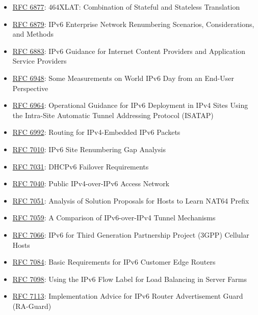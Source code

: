 \documentclass[
]{article}
\begin{document}
\begin{itemize}
  Statement for Renumbering IPv6 Hosts with Static Addresses in
  Enterprise Networks
\item
  \href{https://www.rfc-editor.org/info/rfc6877}{RFC 6877}: 464XLAT:
  Combination of Stateful and Stateless Translation
\item
  \href{https://www.rfc-editor.org/info/rfc6879}{RFC 6879}: IPv6
  Enterprise Network Renumbering Scenarios, Considerations, and Methods
\item
  \href{https://www.rfc-editor.org/info/rfc6883}{RFC 6883}: IPv6
  Guidance for Internet Content Providers and Application Service
  Providers
\item
  \href{https://www.rfc-editor.org/info/rfc6948}{RFC 6948}: Some
  Measurements on World IPv6 Day from an End-User Perspective
\item
  \href{https://www.rfc-editor.org/info/rfc6964}{RFC 6964}: Operational
  Guidance for IPv6 Deployment in IPv4 Sites Using the Intra-Site
  Automatic Tunnel Addressing Protocol (ISATAP)
\item
  \href{https://www.rfc-editor.org/info/rfc6992}{RFC 6992}: Routing for
  IPv4-Embedded IPv6 Packets
\item
  \href{https://www.rfc-editor.org/info/rfc7010}{RFC 7010}: IPv6 Site
  Renumbering Gap Analysis
\item
  \href{https://www.rfc-editor.org/info/rfc7031}{RFC 7031}: DHCPv6
  Failover Requirements
\item
  \href{https://www.rfc-editor.org/info/rfc7040}{RFC 7040}: Public
  IPv4-over-IPv6 Access Network
\item
  \href{https://www.rfc-editor.org/info/rfc7051}{RFC 7051}: Analysis of
  Solution Proposals for Hosts to Learn NAT64 Prefix
\item
  \href{https://www.rfc-editor.org/info/rfc7059}{RFC 7059}: A Comparison
  of IPv6-over-IPv4 Tunnel Mechanisms
\item
  \href{https://www.rfc-editor.org/info/rfc7066}{RFC 7066}: IPv6 for
  Third Generation Partnership Project (3GPP) Cellular Hosts
\item
  \href{https://www.rfc-editor.org/info/rfc7084}{RFC 7084}: Basic
  Requirements for IPv6 Customer Edge Routers
\item
  \href{https://www.rfc-editor.org/info/rfc7098}{RFC 7098}: Using the
  IPv6 Flow Label for Load Balancing in Server Farms
\item
  \href{https://www.rfc-editor.org/info/rfc7113}{RFC 7113}:
  Implementation Advice for IPv6 Router Advertisement Guard (RA-Guard)

\end{itemize}
\end{document}
